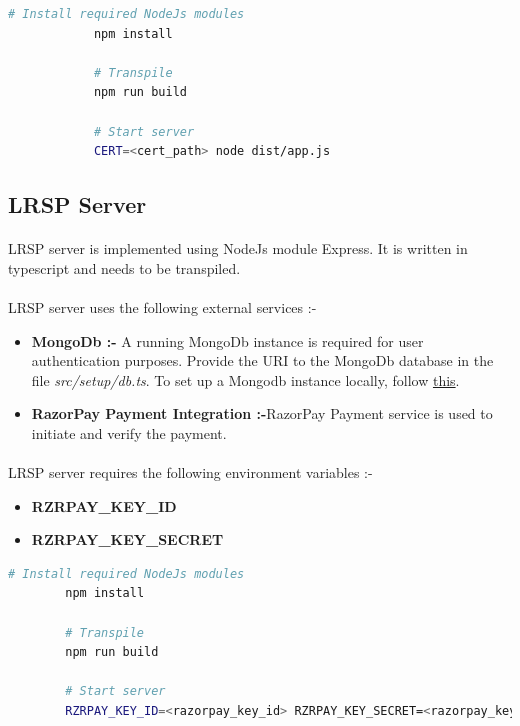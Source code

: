 \documentclass{article}
\begin{document}
        \begin{lstlisting}[language=bash, caption=Verification Server]
            # Install required NodeJs modules
            npm install
        
            # Transpile
            npm run build
        
            # Start server
            CERT=<cert_path> node dist/app.js
            \end{lstlisting}
    
    \subsection{LRSP Server}
        \paragraph{}
        LRSP server is implemented using NodeJs module Express. It is written in typescript and needs to be transpiled.
    
        \paragraph{}
        LRSP server uses the following external services :-
        \begin{itemize}
            \item \textbf{MongoDb :-} A running MongoDb instance is required for user authentication purposes. Provide the URI to the MongoDb database in the file \textit{src/setup/db.ts}. To set up a Mongodb instance locally, follow \href{https://docs.mongodb.com/manual/installation/}{this}.
            \item \textbf{RazorPay Payment Integration :-}RazorPay Payment service is used to initiate and verify the payment.
        \end{itemize}
    
        \paragraph{}
        LRSP server requires the following environment variables :-
        \begin{itemize}
            \item \textbf{RZRPAY\_KEY\_ID}
            \item \textbf{RZRPAY\_KEY\_SECRET}
        \end{itemize}
        
        \begin{lstlisting}[language=bash, caption=LRSP Server]
        # Install required NodeJs modules
        npm install
    
        # Transpile
        npm run build
    
        # Start server
        RZRPAY_KEY_ID=<razorpay_key_id> RZRPAY_KEY_SECRET=<razorpay_key_secret> node dist/main.js
        \end{lstlisting}
    
\end{document}
